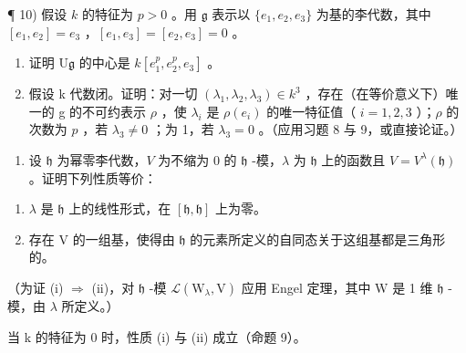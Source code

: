 ¶ 10) 假设 \(k\) 的特征为 \(p > 0\) 。用 \(\mathfrak{g}\) 表示以 \(\{e_1, e_2, e_3\}\) 为基的李代数，其中 \([e_1, e_2] = e_3\) ，\([e_1, e_3] = [e_2, e_3] = 0\) 。

\begin{enumerate}
\def\labelenumi{\alph{enumi})}
\item
  证明 \(\mathrm{U}\mathfrak{g}\) 的中心是 \(k[e_1^p,e_2^p,e_3]\) 。
\item
  假设 k 代数闭。证明：对一切 \((\lambda_{1},\lambda_{2},\lambda_{3})\in k^{3}\) ，存在（在等价意义下）唯一的 g 的不可约表示 \(\rho\) ，使 \(\lambda_{i}\) 是 \(\rho(e_i)\) 的唯一特征值（ \(i = 1,2,3\) ）；\(\rho\) 的次数为 \(p\) ，若 \(\lambda_3 \neq 0\) ；为 1，若 \(\lambda_3 = 0\) 。（应用习题 8 与 9，或直接论证。）
\end{enumerate}

\begin{enumerate}
\def\labelenumi{\arabic{enumi})}
\setcounter{enumi}{10}
\tightlist
\item
  设 \(\mathfrak{h}\) 为幂零李代数，\(V\) 为不缩为 0 的 \(\mathfrak{h}\) -模，\(\lambda\) 为 \(\mathfrak{h}\) 上的函数且 \(V = V^{\lambda}(\mathfrak{h})\) 。证明下列性质等价：
\end{enumerate}

\begin{enumerate}
\def\labelenumi{(\roman{enumi})}
\item
  \(\lambda\) 是 \(\mathfrak{h}\) 上的线性形式，在 \([\mathfrak{h},\mathfrak{h}]\) 上为零。
\item
  存在 \(\mathrm{V}\) 的一组基，使得由 \(\mathfrak{h}\) 的元素所定义的自同态关于这组基都是三角形的。
\end{enumerate}

（为证 (i) \(\Longrightarrow\) (ii)，对 \(\mathfrak{h}\) -模 \(\mathcal{L}(\mathrm{W}_{\lambda},\mathrm{V})\) 应用 Engel 定理，其中 \(\mathrm{W}\) 是 1 维 \(\mathfrak{h}\) -模，由 \(\lambda\) 所定义。）

当 k 的特征为 0 时，性质 (i) 与 (ii) 成立（命题 9）。


